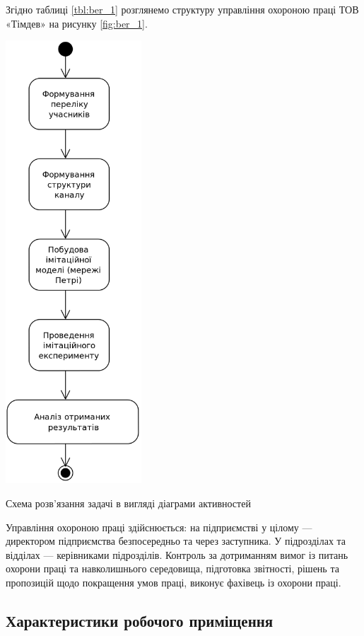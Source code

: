 Згідно таблиці \ref{tbl:ber_1} розглянемо структуру управління охороною праці ТОВ «Тімдев» на рисунку \ref{fig:ber_1}.

\begin{stdfigure}
\includegraphics[width=2in]{images/uml_act_solution_schema.png}
\caption{Схема розв’язання задачі в вигляді діаграми активностей}
\label{fig:ber_1}
\end{stdfigure}   

Управління охороною праці здійснюється: на підприємстві у цілому --- директором підприємства безпосередньо та через заступника. У підрозділах та відділах --- керівниками підрозділів. Контроль за дотриманням вимог із питань охорони праці та навколишнього середовища, підготовка звітності, рішень та пропозицій щодо покращення умов праці, виконує фахівець із охорони праці.

\subsection{Характеристики робочого приміщення}

